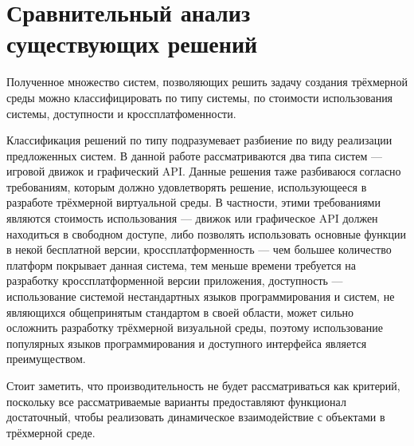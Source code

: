 \chapter{Сравнительный анализ существующих решений}
Полученное множество систем, позволяющих решить задачу создания трёхмерной среды можно классифицировать по типу системы, по стоимости использования системы, доступности и кроссплатфоменности.

Классификация решений по типу подразумевает разбиение по виду реализации предложенных систем. В данной работе рассматриваются два типа систем --- игровой движок и графический API. Данные решения таже разбиваюся согласно требованиям, которым должно удовлетворять решение, использующееся в разработе трёхмерной виртуальной среды. В частности, этими требованиями являются стоимость использования --- движок или графическое API должен находиться в свободном доступе, либо позволять использовать основные функции в некой бесплатной версии, кроссплатформенность --- чем большее количество платформ покрывает данная система, тем меньше времени требуется на разработку кроссплатформенной версии приложения, доступность ---  использование системой нестандартных языков программирования и систем, не являющихся общепринятым стандартом в своей области, может сильно осложнить разработку трёхмерной визуальной среды, поэтому использование популярных языков программирования и доступного интерфейса является преимуществом.

Стоит заметить, что производительность не будет рассматриваться как критерий, поскольку все рассматриваемые варианты предоставляют функционал достаточный, чтобы реализовать динамическое взаимодействие с объектами в трёхмерной среде.

